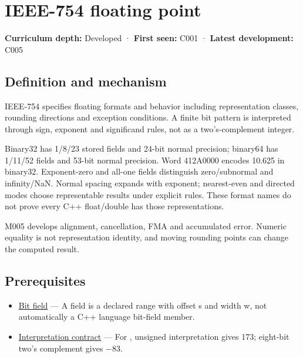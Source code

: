 \hypertarget{appendix-343615f49ddf}{}\label{referencestart:appendix-343615f49ddf}
\section{IEEE-754 floating point}\label{appendix-343615f49ddf-ieee-754-floating-point}

\hypertarget{appendix-343615f49ddf-ieee-754-floating-point}{}

\textbf{Curriculum depth:} Developed · \textbf{First seen:} C001 · \textbf{Latest development:} C005

\begin{allmightroledefinition}

\subsection{Definition and mechanism}\label{appendix-343615f49ddf-definition-and-mechanism}

\hypertarget{appendix-343615f49ddf-definition-and-mechanism}{}

IEEE-754 specifies floating formats and behavior including representation classes, rounding directions and exception conditions. A finite bit pattern is interpreted through sign, exponent and significand rules, not as a two's-complement integer.

\end{allmightroledefinition}

Binary32 has 1/8/23 stored fields and 24-bit normal precision; binary64 has 1/11/52 fields and 53-bit normal precision. Word 412A0000 encodes 10.625 in binary32. Exponent-zero and all-one fields distinguish zero/subnormal and infinity/NaN. Normal spacing expands with exponent; nearest-even and directed modes choose representable results under explicit rules. These format names do not prove every C++ float/double has those representations.

M005 develops alignment, cancellation, FMA and accumulated error. Numeric equality is not representation identity, and moving rounding points can change the computed result.

\subsection{Prerequisites}\label{appendix-343615f49ddf-prerequisites}

\hypertarget{appendix-343615f49ddf-prerequisites}{}

\begin{itemize}
\tightlist
\item
  \hyperref[appendix-ac697f5c66e8]{Bit field} --- A field is a declared range with offset s and width w, not automatically a C++ language bit-field member.
\item
  \hyperref[appendix-f414bd4ed05c]{Interpretation contract} --- For , unsigned interpretation gives 173; eight-bit two's complement gives −83.
\end{itemize}

